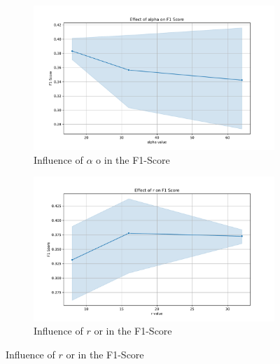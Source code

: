 \documentclass[fleqn,moreauthors,10pt]{ds_report}
\begin{document}
\begin{figure}[ht!]
\centering

\begin{subfigure}[b]{0.89\linewidth} %
    \centering
    \includegraphics[width=\textwidth]{alpha_on_F1_Score.pdf}
    \caption{Influence of $\alpha$ o in the F1-Score}
    \label{fig:image1}
\end{subfigure}

\begin{subfigure}[b]{0.89\linewidth}
    \centering
    \includegraphics[width=\textwidth]{r_on_F1_Score.pdf}
    \caption{Influence of $r$ or in the F1-Score}
    \label{fig:image2}
\end{subfigure}


\end{figure}
\end{document}
